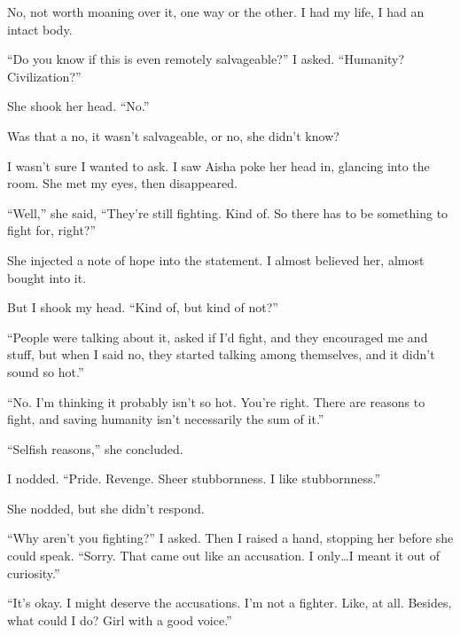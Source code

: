 No, not worth moaning over it, one way or the other.  I had my life, I had an intact body.



``Do you know if this is even remotely salvageable?'' I asked.  ``Humanity?  Civilization?''



She shook her head.  ``No.''



Was that a no, it wasn't salvageable, or no, she didn't know?



I wasn't sure I wanted to ask.  I saw Aisha poke her head in, glancing into the room.  She met my eyes, then disappeared.



``Well,'' she said, ``They're still fighting.  Kind of.  So there has to be something to fight for, right?''



She injected a note of hope into the statement.   I almost believed her, almost bought into it.



But I shook my head.  ``Kind of, but kind of not?''



``People were talking about it, asked if I'd fight, and they encouraged me and stuff, but when I said no, they started talking among themselves, and it didn't sound so hot.''



``No.  I'm thinking it probably isn't so hot.  You're right.  There are reasons to fight, and saving humanity isn't necessarily the sum of it.''



``Selfish reasons,'' she concluded.



I nodded.  ``Pride.  Revenge.  Sheer stubbornness.  I like stubbornness.''



She nodded, but she didn't respond.



``Why aren't you fighting?'' I asked.  Then I raised a hand, stopping her before she could speak.  ``Sorry.  That came out like an accusation.  I only\ldots I meant it out of curiosity.''



``It's okay.  I might deserve the accusations.  I'm not a fighter.  Like, at all.  Besides, what could I do?  Girl with a good voice.''



